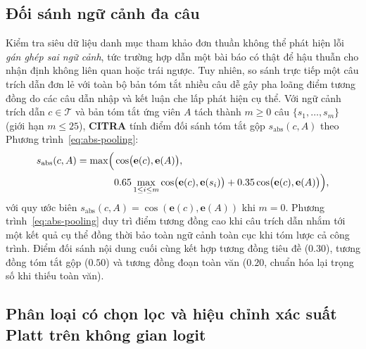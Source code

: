 \subsection{Đối sánh ngữ cảnh đa câu}

Kiểm tra siêu dữ liệu danh mục tham khảo đơn thuần không thể phát hiện lỗi \emph{gán ghép sai ngữ cảnh}, tức trường hợp dẫn một bài báo có thật để hậu thuẫn cho nhận định không liên quan hoặc trái ngược. Tuy nhiên, so sánh trực tiếp một câu trích dẫn đơn lẻ với toàn bộ bản tóm tắt nhiều câu dễ gây pha loãng điểm tương đồng do các câu dẫn nhập và kết luận che lấp phát hiện cụ thể. Với ngữ cảnh trích dẫn $c \in \mathcal{T}$ và bản tóm tắt ứng viên $A$ tách thành $m \ge 0$ câu $\{s_1, \dots, s_m\}$ (giới hạn $m \le 25$), \textbf{CITRA} tính điểm đối sánh tóm tắt gộp $s_{\text{abs}}(c, A)$ theo Phương trình~\eqref{eq:abs-pooling}:
\begin{equation}\label{eq:abs-pooling}
\begin{split}
s_{\text{abs}}(c, A) = \max\Bigl(&\cos\bigl(\mathbf{e}(c), \mathbf{e}(A)\bigr),\\
&0.65 \max_{1 \le i \le m} \cos\bigl(\mathbf{e}(c), \mathbf{e}(s_i)\bigr) + 0.35 \cos\bigl(\mathbf{e}(c), \mathbf{e}(A)\bigr)\Bigr),
\end{split}
\end{equation}
với quy ước biên $s_{\text{abs}}(c, A) = \cos(\mathbf{e}(c), \mathbf{e}(A))$ khi $m = 0$. Phương trình~\eqref{eq:abs-pooling} duy trì điểm tương đồng cao khi câu trích dẫn nhắm tới một kết quả cụ thể đồng thời bảo toàn ngữ cảnh toàn cục khi tóm lược cả công trình. Điểm đối sánh nội dung cuối cùng kết hợp tương đồng tiêu đề ($0.30$), tương đồng tóm tắt gộp ($0.50$) và tương đồng đoạn toàn văn ($0.20$, chuẩn hóa lại trọng số khi thiếu toàn văn).

\subsection{Phân loại có chọn lọc và hiệu chỉnh xác suất Platt trên không gian logit}

